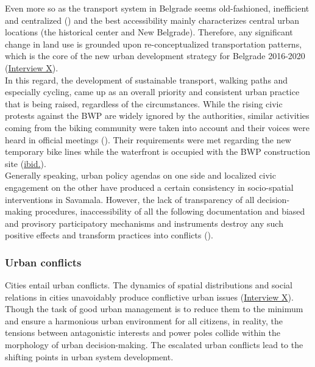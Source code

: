 \documentclass[11pt]{report}
\begin{document}
Even more so as the transport system in Belgrade seems old-fashioned, inefficient and centralized (\href{ref}{\citealt{grozdanic_belgrade_2008}}) and the best accessibility mainly characterizes central urban locations (the historical center and New Belgrade). Therefore, any significant change in land use is grounded upon re-conceptualized transportation patterns, which is the core of the new urban development strategy for Belgrade 2016-2020 (\href{InterviewX}{Interview X}).
\\

In this regard, the development of sustainable transport, walking paths and especially cycling, came up as an overall priority and consistent urban practice that is being raised, regardless of the circumstances. While the rising civic protests against the BWP are widely ignored by the authorities, similar activities coming from the biking community were taken into account and their voices were heard in official meetings  (\cite{uzb ulice za bicikliste}).
Their requirements were met regarding the new temporary bike lines while the waterfront is occupied with the BWP construction site (\href{uzb}{ibid.}).
\\

Generally speaking, urban policy agendas on one side and localized civic engagement on the other have produced a certain consistency in socio-spatial interventions in Savamala. However, the lack of transparency of all decision-making procedures, inaccessibility of all the following documentation and biased and provisory participatory mechanisms and instruments destroy any such positive effects and transform practices into conflicts (\href{MP}{\citealt{ministarstvo_prostora_urbani_2014}}).

\subsubsection{Urban conflicts}

Cities entail urban conflicts. The dynamics of spatial distributions and social relations in cities unavoidably produce conflictive urban issues (\href{InterviewX}{Interview X}).
Though the task of good urban management is to reduce them to the minimum and ensure a harmonious urban environment for all citizens, in reality, the tensions between antagonistic interests and power poles collide within the morphology of urban decision-making. The escalated urban conflicts lead to the shifting points in urban system development.
\\
\end{document}
